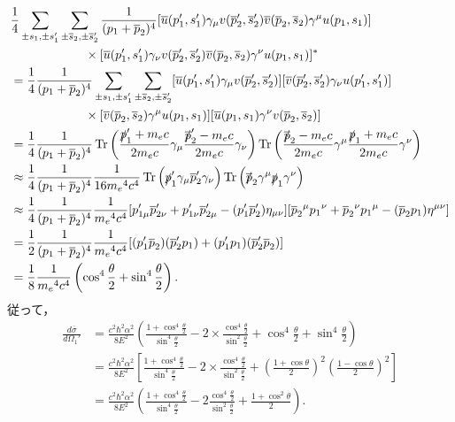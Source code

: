 \begin{align*}
  & \frac{1}{4} \sum_{\pm s_1, \pm s_1'} \sum_{\pm \overline{s}_2, \pm\overline{s}_2'} \frac{1}{(p_1 +\overline{p}_2)^4} [\overline{u}(p_1', s_1') \gamma_\mu v(\overline{p}_2', \overline{s}_2') \overline{v}(\overline{p}_2, \overline{s}_2) \gamma^\mu u(p_1, s_1)] \\
  &\qquad\qquad\qquad \times [\overline{u}(p_1', s_1') \gamma_\nu v(\overline{p}_2', \overline{s}_2') \overline{v}(\overline{p}_2, \overline{s}_2) \gamma^\nu u(p_1, s_1)]^* \\
  & = \frac{1}{4} \frac{1}{(p_1 +\overline{p}_2)^4} \sum_{\pm s_1, \pm s_1'} \sum_{\pm \overline{s}_2, \pm\overline{s}_2'} [\overline{u}(p_1', s_1') \gamma_\mu v(\overline{p}_2', \overline{s}_2')] [\overline{v}(\overline{p}_2', \overline{s}_2') \gamma_\nu u(p_1', s_1')] \\
  &\qquad\qquad\qquad \times [\overline{v}(\overline{p}_2, \overline{s}_2) \gamma^\mu u(p_1, s_1)] [\overline{u}(p_1, s_1) \gamma^\nu v(\overline{p}_2, \overline{s}_2)] \\
  & = \frac{1}{4} \frac{1}{(p_1 +\overline{p}_2)^4} \operatorname{Tr} \left( \frac{\slashed{p}_1'+m_ec}{2m_ec} \gamma_\mu \frac{\slashed{\overline{p}}_2'-m_ec}{2m_ec} \gamma_\nu \right) \operatorname{Tr} \left( \frac{\slashed{\overline{p}}_2 - m_ec}{2m_ec} \gamma^\mu \frac{\slashed{p}_1 + m_ec}{2m_ec} \gamma^\nu \right) \\
  & \approx \frac{1}{4} \frac{1}{(p_1 +\overline{p}_2)^4} \frac{1}{16m_e{}^4c^4} \operatorname{Tr} \left( \slashed{p}_1' \gamma_\mu \overline{p}_2' \gamma_\nu \right) \operatorname{Tr} \left( \slashed{\overline{p}}_2 \gamma^\mu \slashed{p}_1 \gamma^\nu \right) \\
  & \approx \frac{1}{4} \frac{1}{(p_1 +\overline{p}_2)^4} \frac{1}{m_e{}^4c^4} [p_{1\mu}'\overline{p}_{2\nu}' + p_{1\nu}'\overline{p}_{2\mu}' - (p_1'\overline{p}_2')\eta_{\mu\nu}] [\overline{p}_2{}^\mu p_1{}^\nu + \overline{p}_2{}^\nu p_1{}^\mu - (\overline{p}_2 p_1)\eta^{\mu\nu}] \\
  & = \frac{1}{2} \frac{1}{(p_1 +\overline{p}_2)^4} \frac{1}{m_e{}^4c^4} [(p_1'\overline{p}_2)(\overline{p}_2'p_1) + (p_1'p_1)(\overline{p}_2'\overline{p}_2)] \\
  & = \frac{1}{8} \frac{1}{m_e{}^4c^4} \left( \cos^4\frac{\theta}{2} + \sin^4\frac{\theta}{2} \right).
\end{align*}
従って，
\begin{align*}
  \frac{d\overline{\sigma}}{d\Omega_1'} & = \frac{c^2\hbar^2\alpha^2}{8E^2}\left(\frac{1+\cos^4\frac{\theta}{2}}{\sin^4\frac{\theta}{2}} - 2\times\frac{\cos^4\frac{\theta}{2}}{\sin^2\frac{\theta}{2}} + \cos^4\frac{\theta}{2} + \sin^4\frac{\theta}{2}\right) \\
  & = \frac{c^2\hbar^2\alpha^2}{8E^2}\left[ \frac{1+\cos^4\frac{\theta}{2}}{\sin^4\frac{\theta}{2}} - 2\times\frac{\cos^4\frac{\theta}{2}}{\sin^2\frac{\theta}{2}} + \left(\frac{1 + \cos\theta}{2}\right)^2\left(\frac{1 - \cos\theta}{2}\right)^2 \right] \\
  & = \frac{c^2\hbar^2\alpha^2}{8E^2}\left(\frac{1+\cos^4\frac{\theta}{2}}{\sin^4\frac{\theta}{2}} - 2\frac{\cos^4\frac{\theta}{2}}{\sin^2\frac{\theta}{2}} + \frac{1 + \cos^2\theta}{2}\right).
\end{align*}

